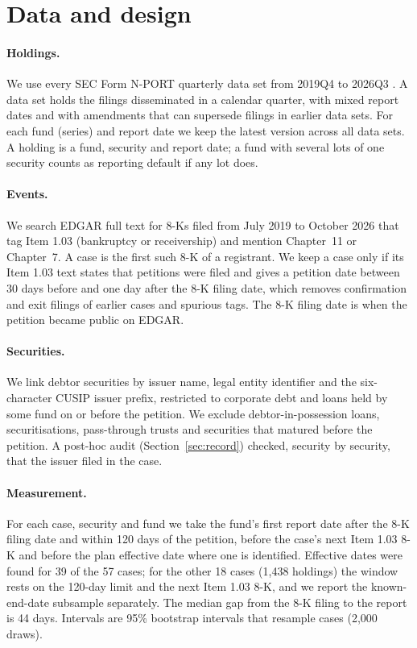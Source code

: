 \documentclass[11pt]{article}
\begin{document}
\section{Data and design}\label{sec:data}

\paragraph{Holdings.} We use every SEC Form N-PORT quarterly data set from 2019Q4 to 2026Q3
\citep{sec_nport_data}. A data set holds the filings disseminated in a calendar quarter, with mixed report
dates and with amendments that can supersede filings in earlier data sets. For each fund (series) and
report date we keep the latest version across all data sets. A holding is a fund, security and report
date; a fund with several lots of one security counts as reporting default if any lot does.

\paragraph{Events.} We search EDGAR full text for 8-Ks filed from July 2019 to October 2026 that tag Item
1.03 (bankruptcy or receivership) and mention Chapter~11 or Chapter~7. A case is the first such 8-K of a
registrant. We keep a case only if its Item 1.03 text states that petitions were filed and gives a
petition date between 30 days before and one day after the 8-K filing date, which removes confirmation
and exit filings of earlier cases and spurious tags. The 8-K filing date is when the petition became
public on EDGAR.

\paragraph{Securities.} We link debtor securities by issuer name, legal entity identifier and the
six-character CUSIP issuer prefix, restricted to corporate debt and loans held by some fund on or before
the petition. We exclude debtor-in-possession loans, securitisations, pass-through trusts and
securities that matured before the petition. A post-hoc audit (Section~\ref{sec:record}) checked, security
by security, that the issuer filed in the case.

\paragraph{Measurement.} For each case, security and fund we take the fund's first report date after the
8-K filing date and within 120 days of the petition, before the case's next Item 1.03 8-K and before the
plan effective date where one is identified. Effective dates were found for 39 of the 57 cases; for the
other 18 cases (1,438 holdings) the window rests on the 120-day limit and the next Item 1.03 8-K, and we
report the known-end-date subsample separately. The median gap from the 8-K filing to the report is 44
days. Intervals are 95\% bootstrap intervals that resample cases (2,000 draws).
\end{document}
